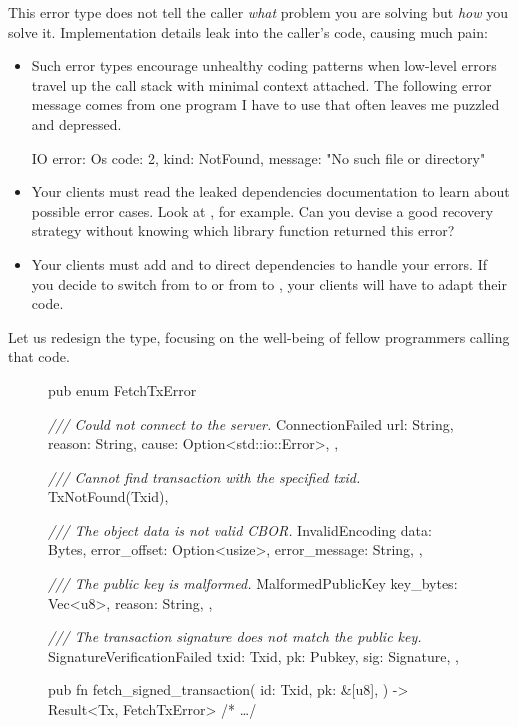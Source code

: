 \documentclass{article}
\begin{document}
This error type does not tell the caller \emph{what} problem you are solving but \emph{how} you solve it.
Implementation details leak into the caller's code, causing much pain:
\begin{itemize}
 \item
   Such error types encourage unhealthy coding patterns when low-level errors travel up the call stack with minimal context attached.
   The following error message comes from one program I have to use that often leaves me puzzled and depressed.
   \begin{code}[bad]IO error: Os { code: 2, kind: NotFound, message: "No such file or directory" }\end{code}
 \item
   Your clients must read the leaked dependencies documentation to learn about possible error cases.
   Look at \href{https://docs.rs/openssl/0.10.42/openssl/ssl/struct.Error.html}{}, for example.
   Can you devise a good recovery strategy without knowing which  library function returned this error?
 \item
   Your clients must add  and  to direct dependencies to handle your errors.
   If you decide to switch from  to  or from  to , your clients will have to adapt their code.
\end{itemize}

Let us redesign the  type, focusing on the well-being of fellow programmers calling that code.

\begin{figure}
\begin{code}[good]
pub enum FetchTxError {
  \emph{/// Could not connect to the server.}
  ConnectionFailed {
    url: String,
    reason: String,
    cause: Option<std::io::Error>, 
  },

  \emph{/// Cannot find transaction with the specified txid.}
  TxNotFound(Txid), 

  \emph{/// The object data is not valid CBOR.}
  InvalidEncoding { 
    data: Bytes,
    error_offset: Option<usize>,
    error_message: String,
  },

  \emph{/// The public key is malformed.}
  MalformedPublicKey { 
    key_bytes: Vec<u8>,
    reason: String,
  },

  \emph{/// The transaction signature does not match the public key.}
  SignatureVerificationFailed { 
    txid: Txid,
    pk: Pubkey,
    sig: Signature,
  },
}

pub fn fetch_signed_transaction(
  id: Txid,
  pk: &[u8],
) -> Result<Tx, FetchTxError> { /* \ldots  */ }
\end{code}
\end{figure}
\end{document}
